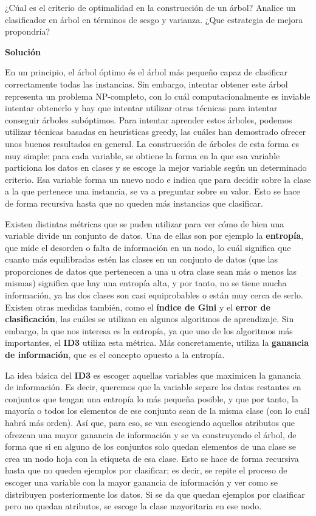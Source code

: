 \documentclass[11pt,a4paper]{article}
\newcommand{\answer}{\noindent\textbf{Solución}}
\begin{document}
\noindent ¿Cúal es el criterio de optimalidad en la construcción de un árbol? Analice un clasificador
en árbol en términos de sesgo y varianza. ¿Que estrategia de mejora propondría?

\answer

En un principio, el árbol óptimo és el árbol más pequeño capaz de clasificar correctamente todas las instancias. Sin embargo,
intentar obtener este árbol representa un problema NP-completo, con lo cuál computacionalmente es inviable intentar obtenerlo
y hay que intentar utilizar otras técnicas para intentar conseguir árboles subóptimos. Para intentar aprender estos árboles,
podemos utilizar técnicas basadas en heurísticas greedy, las cuáles han demostrado ofrecer unos buenos resultados en general.
La construcción de árboles de esta forma es muy simple: para cada variable, se obtiene la forma en la que esa variable particiona
los datos en clases y se escoge la mejor variable según un determinado criterio. Esa variable forma un nuevo nodo e indica que para
decidir sobre la clase a la que pertenece una instancia, se va a preguntar sobre su valor. Esto se hace de forma recursiva hasta que
no queden más instancias que clasificar.

Existen distintas métricas que se puden utilizar para ver cómo de bien una variable divide un conjunto de datos. Una de ellas
son por ejemplo la \textbf{entropía}, que mide el desorden o falta de información en un nodo, lo cuál significa que cuanto más
equilibradas estén las clases en un conjunto de datos (que las proporciones de datos que pertenecen a una u otra clase sean más o
menos las mismas) significa que hay una entropía alta, y por tanto, no se tiene mucha información, ya las dos clases son casi
equiprobables o están muy cerca de serlo. Existen otras medidas también, como el \textbf{índice de Gini} y el \textbf{error de
clasificación}, las cuáles se utilizan en algunos algoritmos de aprendizaje. Sin embargo, la que nos interesa es la entropía,
ya que uno de los algoritmos más importantes, el \textbf{ID3} utiliza esta métrica. Más concretamente, utiliza la \textbf{ganancia
de información}, que es el concepto opuesto a la entropía.

La idea básica del \textbf{ID3} es escoger aquellas variables que maximicen la ganancia de información. Es decir, queremos
que la variable separe los datos restantes en conjuntos que tengan una entropía lo más pequeña posible, y que por tanto, la mayoría o
todos los elementos de ese conjunto sean de la misma clase (con lo cuál habrá más orden). Así que, para eso, se van escogiendo
aquellos atributos que ofrezcan una mayor ganancia de información y se va construyendo el árbol, de forma que si en alguno de los
conjuntos solo quedan elementos de una clase se crea un nodo hoja con la etiqueta de esa clase. Esto se hace de forma recursiva hasta
que no queden ejemplos por clasificar; es decir, se repite el proceso de escoger una variable con la mayor ganancia de información
y ver como se distribuyen posteriormente los datos. Si se da que quedan ejemplos por clasificar pero no quedan atributos, se escoge
la clase mayoritaria en ese nodo.
\end{document}
